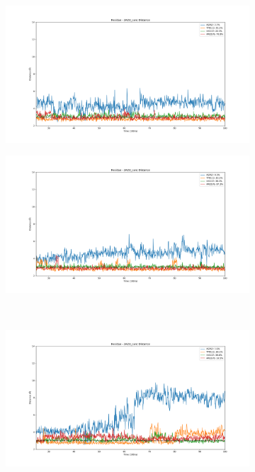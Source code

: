 \documentclass[fleqn,10pt]{wlscirep}
\begin{document}
\begin{figure}[!ht]
\centering
   \begin{subfigure}{.45\textwidth}
     \centering
     \includegraphics[width=.95\linewidth]{2AZU_canc/2AZU_canc-dist_0.png}
   \end{subfigure}
   \begin{subfigure}{.45\textwidth}
     \centering
     \includegraphics[width=.95\linewidth]{2AZU_canc/2AZU_canc-dist_1.png}
   \end{subfigure}
   \\
   \begin{subfigure}{.45\textwidth}
     \centering
     \includegraphics[width=.95\linewidth]{2AZU_canc/2AZU_canc-dist_2.png}

\end{subfigure}
\end{figure}
\end{document}
